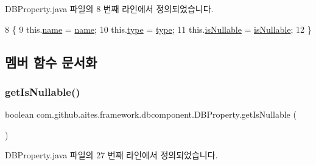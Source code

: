 D\+B\+Property.\+java 파일의 8 번째 라인에서 정의되었습니다.


\begin{DoxyCode}
8                                                                        \{
9             this.\mbox{\hyperlink{classcom_1_1github_1_1aites_1_1framework_1_1dbcomponent_1_1_d_b_property_ada4967ef698663a6b4d30402e6945702}{name}} = \mbox{\hyperlink{classcom_1_1github_1_1aites_1_1framework_1_1dbcomponent_1_1_d_b_property_ada4967ef698663a6b4d30402e6945702}{name}};
10             this.\mbox{\hyperlink{classcom_1_1github_1_1aites_1_1framework_1_1dbcomponent_1_1_d_b_property_aee1abc4b687abc96bedf9b19d1f52a95}{type}} = \mbox{\hyperlink{classcom_1_1github_1_1aites_1_1framework_1_1dbcomponent_1_1_d_b_property_aee1abc4b687abc96bedf9b19d1f52a95}{type}};
11             this.\mbox{\hyperlink{classcom_1_1github_1_1aites_1_1framework_1_1dbcomponent_1_1_d_b_property_a09f366cba7a3b9bc3dfeb0cc2941b964}{isNullable}} = \mbox{\hyperlink{classcom_1_1github_1_1aites_1_1framework_1_1dbcomponent_1_1_d_b_property_a09f366cba7a3b9bc3dfeb0cc2941b964}{isNullable}};
12         \}
\end{DoxyCode}


\subsection{멤버 함수 문서화}
\mbox{\label{classcom_1_1github_1_1aites_1_1framework_1_1dbcomponent_1_1_d_b_property_ab9502f62c73fe99c0328b77ed89b1b81}} 
\subsubsection{\texorpdfstring{get\+Is\+Nullable()}{getIsNullable()}}
{\footnotesize\ttfamily boolean com.\+github.\+aites.\+framework.\+dbcomponent.\+D\+B\+Property.\+get\+Is\+Nullable (\begin{DoxyParamCaption}{ }\end{DoxyParamCaption})}



D\+B\+Property.\+java 파일의 27 번째 라인에서 정의되었습니다.


